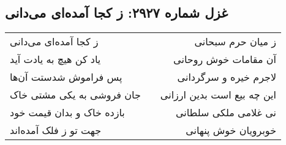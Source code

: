 \begin{center}
\section*{غزل شماره ۲۹۲۷: ز کجا آمده‌ای می‌دانی}
\label{sec:2927}
\begin{longtable}{l p{0.5cm} r}
ز کجا آمده‌ای می‌دانی
&&
ز میان حرم سبحانی
\\
یاد کن هیچ به یادت آید
&&
آن مقامات خوش روحانی
\\
پس فراموش شدستت آن‌ها
&&
لاجرم خیره و سرگردانی
\\
جان فروشی به یکی مشتی خاک
&&
این چه بیع است بدین ارزانی
\\
بازده خاک و بدان قیمت خود
&&
نی غلامی ملکی سلطانی
\\
جهت تو ز فلک آمده‌اند
&&
خوبرویان خوش پنهانی
\\
\end{longtable}
\end{center}
